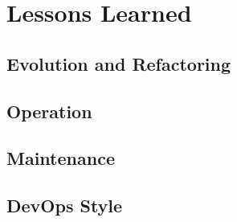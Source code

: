 \chapter{Lessons Learned}

\section{Evolution and Refactoring}

\section{Operation}

\section{Maintenance}


\section{DevOps Style}